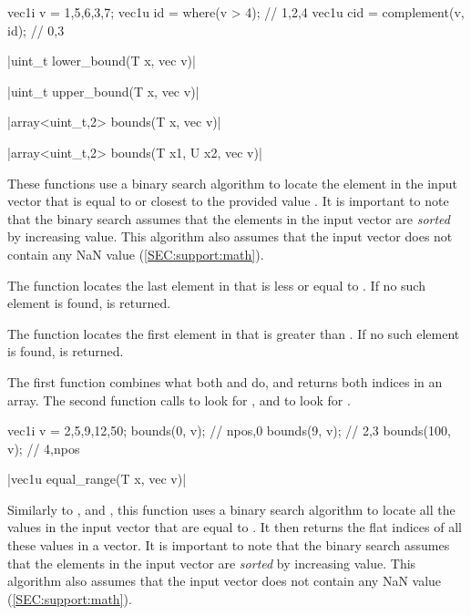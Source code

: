\begin{example}
\begin{cppcode}
vec1i v = {1,5,6,3,7};
vec1u id = where(v > 4); // {1,2,4}
vec1u cid = complement(v, id); // {0,3}
\end{cppcode}
\end{example}

\funcitem \cppinline|uint_t lower_bound(T x, vec v)| 

\cppinline|uint_t upper_bound(T x, vec v)| 

\cppinline|array<uint_t,2> bounds(T x, vec v)| 

\cppinline|array<uint_t,2> bounds(T x1, U x2, vec v)|

These functions use a binary search algorithm to locate the element in the input vector  that is equal to or closest to the provided value . It is important to note that the binary search assumes that the elements in the input vector are \emph{sorted} by increasing value. This algorithm also assumes that the input vector does not contain any NaN value (\ref{SEC:support:math}).

The  function locates the last element in  that is less or equal to . If no such element is found,  is returned.

The  function locates the first element in  that is greater than . If no such element is found,  is returned.

The first  function combines what both  and  do, and returns both indices in an array. The second  function calls  to look for , and  to look for .

\begin{example}
\begin{cppcode}
vec1i v = {2,5,9,12,50};
bounds(0, v);   // {npos,0}
bounds(9, v);   // {2,3}
bounds(100, v); // {4,npos}
\end{cppcode}
\end{example}

\funcitem \cppinline|vec1u equal_range(T x, vec v)| 

Similarly to ,  and , this function uses a binary search algorithm to locate all the values in the input vector  that are equal to . It then returns the flat indices of all these values in a vector. It is important to note that the binary search assumes that the elements in the input vector are \emph{sorted} by increasing value. This algorithm also assumes that the input vector does not contain any NaN value (\ref{SEC:support:math}).

